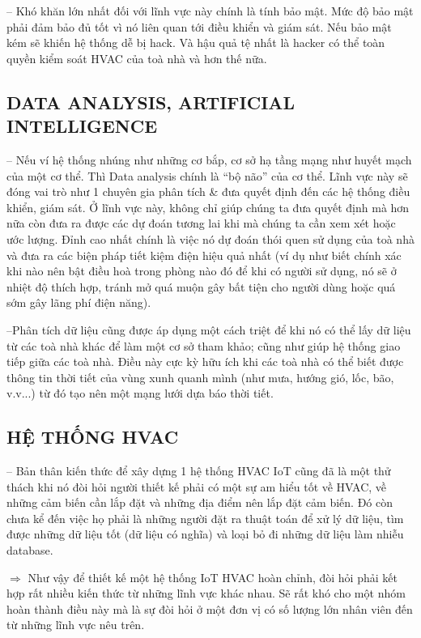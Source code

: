 -- Khó khăn lớn nhất đối với lĩnh vực này chính là tính bảo mật. Mức độ bảo mật phải đảm bảo đủ tốt vì nó liên quan tới điều khiển và giám sát. Nếu bảo mật kém sẽ khiến hệ thống dễ bị hack. Và hậu quả tệ nhất là hacker có thể toàn quyền kiểm soát HVAC của toà nhà và hơn thế nữa.

\subsection{DATA ANALYSIS, ARTIFICIAL INTELLIGENCE}
-- Nếu ví hệ thống nhúng như những cơ bắp, cơ sở hạ tầng mạng như huyết mạch của một cơ thể. Thì Data analysis chính là ``bộ não'' của cơ thể. Lĩnh vực này sẽ đóng vai trò như 1 chuyên gia phân tích \& đưa quyết định đến các hệ thống điều khiển, giám sát. Ở lĩnh vực này, không chỉ giúp chúng ta đưa quyết định mà hơn nữa còn đưa ra được các dự đoán tương lai khi mà chúng ta cần xem xét hoặc ước lượng. Đỉnh cao nhất chính là việc nó dự đoán thói quen sử dụng của toà nhà và đưa ra các biện pháp tiết kiệm điện hiệu quả nhất (ví dụ như biết chính xác khi nào nên bật điều hoà trong phòng nào đó để khi có người sử dụng, nó sẽ ở nhiệt độ thích hợp, tránh mở quá muộn gây bất tiện cho người dùng hoặc quá sớm gây lãng phí điện năng).

--Phân tích dữ liệu cũng được áp dụng một cách triệt để khi nó có thể lấy dữ liệu từ các toà nhà khác để làm một cơ sở tham khảo; cũng như giúp hệ thống giao tiếp giữa các toà nhà. Điều này cực kỳ hữu ích khi các toà nhà có thể biết được thông tin thời tiết của vùng xunh quanh mình (như mưa, hướng gió, lốc, bão, v.v...) từ đó tạo nên một mạng lưới dựa báo thời tiết. 

\subsection{HỆ THỐNG HVAC}
-- Bản thân kiến thức để xây dựng 1 hệ thống HVAC IoT cũng đã là một thử thách khi nó đòi hỏi người thiết kế phải có một sự am hiểu tốt về HVAC, về những cảm biến cần lắp đặt và những địa điểm nên lắp đặt cảm biến. Đó còn chưa kể đến việc họ phải là những người đặt ra thuật toán để xử lý dữ liệu, tìm được những dữ liệu tốt (dữ liệu có nghĩa) và loại bỏ đi những dữ liệu làm nhiễu database.

$\Rightarrow$ Như vậy để thiết kế một hệ thống IoT HVAC hoàn chỉnh, đòi hỏi phải kết hợp rất nhiều kiến thức từ những lĩnh vực khác nhau. Sẽ rất khó cho một nhóm hoàn thành điều này mà là sự đòi hỏi ở một đơn vị có số lượng lớn nhân viên đến từ những lĩnh vực nêu trên.


